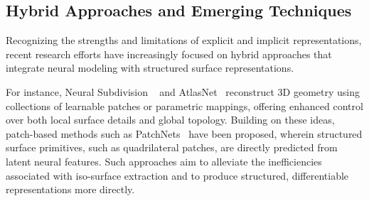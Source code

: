 \subsection{Hybrid Approaches and Emerging Techniques}

Recognizing the strengths and limitations of explicit and implicit representations, recent research efforts have increasingly focused on hybrid approaches that integrate neural modeling with structured surface representations.  

For instance, Neural Subdivision ~\cite{liu2020} and AtlasNet~\cite{groueix2018} reconstruct 3D geometry using collections of learnable patches or parametric mappings, offering enhanced control over both local surface details and global topology.  
Building on these ideas, patch-based methods such as PatchNets~\cite{sivaram2024} have been proposed, wherein structured surface primitives, such as quadrilateral patches, are directly predicted from latent neural features.  
Such approaches aim to alleviate the inefficiencies associated with iso-surface extraction and to produce structured, differentiable representations more directly.